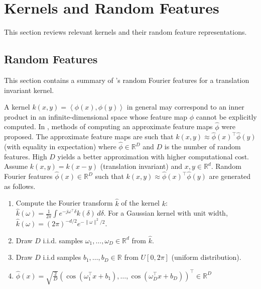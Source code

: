\documentclass[english]{article}
\theoremstyle{plain}
\theoremstyle{plain}
\begin{document}
\section{Kernels and Random Features}
\label{sec:kernel_random_features}

This section reviews relevant kernels and their random feature representations.

\subsection{Random Features}

This section contains a summary of 's random
Fourier features for a translation invariant kernel. 

A kernel $k(x,y)=\left\langle \phi(x),\phi(y)\right\rangle $ in general
may correspond to an inner product in an infinite-dimensional space
whose feature map $\phi$ cannot be explicitly computed. In ,
methods of computing an approximate feature maps $\hat{\phi}$ were
proposed. The approximate feature maps are such that $k(x,y)\approx\hat{\phi}(x)^{\top}\hat{\phi}(y)$
(with equality in expectation) where $\hat{\phi}\in\mathbb{R}^{D}$
and $D$ is the number of random features. High $D$ yields a better
approximation with higher computational cost. Assume $k(x,y)=k(x-y)$ (translation invariant)
and $x,y\in\mathbb{R}^{d}$. Random Fourier features $\hat{\phi}(x)\in\mathbb{R}^{D}$
such that $k(x,y)\approx\hat{\phi}(x)^{\top}\hat{\phi}(y)$ are generated
as follows.
\begin{enumerate}
\item Compute the Fourier transform $\hat{k}$ of the kernel $k$: $\hat{k}(\omega)=\frac{1}{2\pi}\int e^{-j\omega^{\top}\delta}k(\delta)\, d\delta$.
For a Gaussian kernel with unit width, $\hat{k}(\omega)=\left(2\pi\right)^{-d/2}e^{-\|\omega\|^{2}/2}$.
\item Draw $D$ i.i.d. samples $\omega_{1},\ldots,\omega_{D}\in\mathbb{R}^{d}$
from $\hat{k}$. 
\item Draw $D$ i.i.d samples $b_{1},\ldots,b_{D}\in\mathbb{R}$ from $U[0,2\pi]$
(uniform distribution).
\item $\hat{\phi}(x)=\sqrt{\frac{2}{D}}\left(\cos\left(\omega_{1}^{\top}x+b_{1}\right),\ldots,\cos\left(\omega_{D}^{\top}x+b_{D}\right)\right)^{\top}\in\mathbb{R}^{D}$
\end{enumerate}
\end{document}
